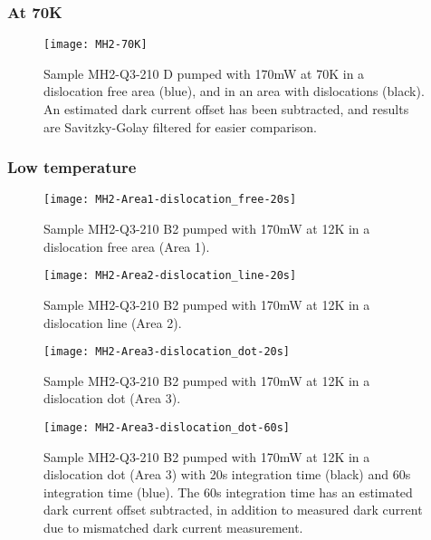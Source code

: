 \subsubsection{At 70K}
\begin{figure}[H]
\centering
\texttt{[image: MH2-70K]}
\caption[MH2-Q3-210 at 70K]{Sample MH2-Q3-210 D pumped with 170mW at 70K in a dislocation free area (blue), and in an area with dislocations (black). An estimated dark current offset has been subtracted, and results are Savitzky-Golay filtered for easier comparison.}
\label{fig:MH2-70K}%
\end{figure}

\subsubsection{Low temperature}

\begin{figure}[H]
\centering
\texttt{[image: MH2-Area1-dislocation\_free-20s]}
\caption[MH2-Q3-210 at area 1]{Sample MH2-Q3-210 B2 pumped with 170mW at 12K in a dislocation free area (Area 1).}
\label{fig:MH2-Area1-dislocation_free-20s}%
\end{figure}

\begin{figure}[H]
\centering
\texttt{[image: MH2-Area2-dislocation\_line-20s]}
\caption[MH2-Q3-210 at area 2]{Sample MH2-Q3-210 B2 pumped with 170mW at 12K in a dislocation line (Area 2).}
\label{fig:MH2-Area2-dislocation_line-20s}%
\end{figure}

\begin{figure}[H]
\centering
\texttt{[image: MH2-Area3-dislocation\_dot-20s]}
\caption[MH2-Q3-210 at area 3]{Sample MH2-Q3-210 B2 pumped with 170mW at 12K in a dislocation dot (Area 3).}
\label{fig:MH2-Area3-dislocation_dot-20s}%
\end{figure}

\begin{figure}[H]
\centering
\texttt{[image: MH2-Area3-dislocation\_dot-60s]}
\caption[MH2-Q3-210 at area 3]{Sample MH2-Q3-210 B2 pumped with 170mW at 12K in a dislocation dot (Area 3) with 20s integration time (black) and 60s integration time (blue). The 60s integration time has an estimated dark current offset subtracted, in addition to measured dark current due to mismatched dark current measurement.}
\label{fig:MH2-Area3-dislocation_dot-60s}%
\end{figure}

